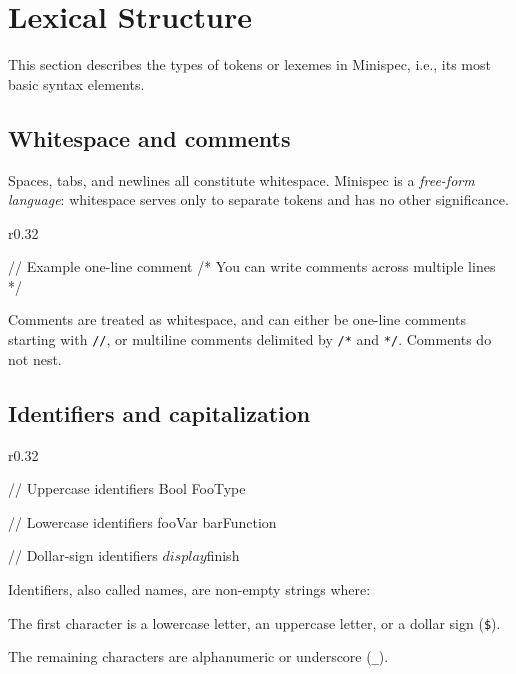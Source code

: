 \section{Lexical Structure}
\label{sec:lexical}

This section describes the types of tokens or lexemes in Minispec, i.e., its most basic syntax elements.

\subsection{Whitespace and comments}

Spaces, tabs, and newlines all constitute whitespace.
Minispec is a \emph{free-form language}: whitespace serves only to separate tokens and has no other significance.

\begin{wrapfigure}{r}{0.32\columnwidth}
\vspace{-2em}
\begin{mscode}
// Example one-line comment
/* You can write comments
   across multiple lines */
\end{mscode}
\vspace{-2em}
\end{wrapfigure}
Comments are treated as whitespace, and can either be one-line comments starting with \texttt{//},
or multiline comments delimited by \texttt{/*} and \texttt{*/}. Comments do not nest.

\subsection{Identifiers and capitalization}

\begin{wrapfigure}{r}{0.32\columnwidth}
\vspace{-2em}
\begin{mscode}
// Uppercase identifiers
Bool
FooType

// Lowercase identifiers
fooVar
barFunction

// Dollar-sign identifiers
$display
$finish
\end{mscode}
\vspace{-4em}
\end{wrapfigure}

Identifiers, also called names, are non-empty strings where:
\begin{compactitem}
\item The first character is a lowercase letter, an uppercase letter, or a dollar sign (\texttt{\$}).
\item The remaining characters are alphanumeric or underscore (\texttt{\_}).
\end{compactitem}

